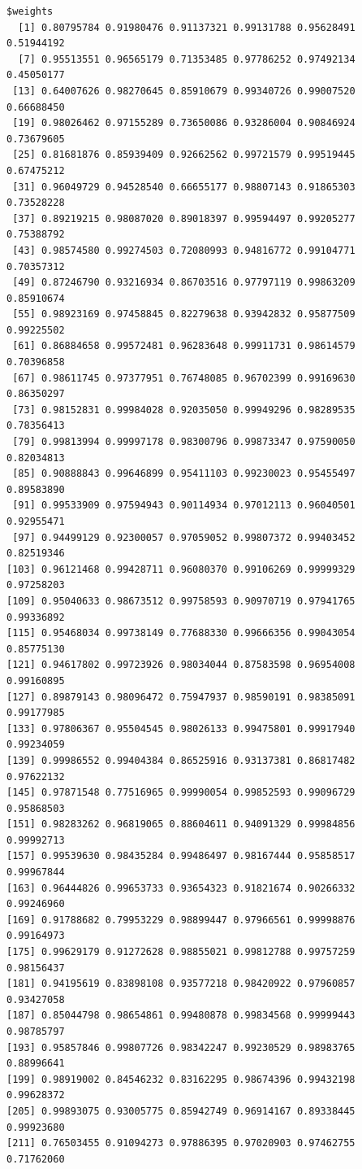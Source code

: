\documentclass[
  11pt,
  a4paper,
]{report}
\begin{document}
\begin{verbatim}
$weights
  [1] 0.80795784 0.91980476 0.91137321 0.99131788 0.95628491 0.51944192
  [7] 0.95513551 0.96565179 0.71353485 0.97786252 0.97492134 0.45050177
 [13] 0.64007626 0.98270645 0.85910679 0.99340726 0.99007520 0.66688450
 [19] 0.98026462 0.97155289 0.73650086 0.93286004 0.90846924 0.73679605
 [25] 0.81681876 0.85939409 0.92662562 0.99721579 0.99519445 0.67475212
 [31] 0.96049729 0.94528540 0.66655177 0.98807143 0.91865303 0.73528228
 [37] 0.89219215 0.98087020 0.89018397 0.99594497 0.99205277 0.75388792
 [43] 0.98574580 0.99274503 0.72080993 0.94816772 0.99104771 0.70357312
 [49] 0.87246790 0.93216934 0.86703516 0.97797119 0.99863209 0.85910674
 [55] 0.98923169 0.97458845 0.82279638 0.93942832 0.95877509 0.99225502
 [61] 0.86884658 0.99572481 0.96283648 0.99911731 0.98614579 0.70396858
 [67] 0.98611745 0.97377951 0.76748085 0.96702399 0.99169630 0.86350297
 [73] 0.98152831 0.99984028 0.92035050 0.99949296 0.98289535 0.78356413
 [79] 0.99813994 0.99997178 0.98300796 0.99873347 0.97590050 0.82034813
 [85] 0.90888843 0.99646899 0.95411103 0.99230023 0.95455497 0.89583890
 [91] 0.99533909 0.97594943 0.90114934 0.97012113 0.96040501 0.92955471
 [97] 0.94499129 0.92300057 0.97059052 0.99807372 0.99403452 0.82519346
[103] 0.96121468 0.99428711 0.96080370 0.99106269 0.99999329 0.97258203
[109] 0.95040633 0.98673512 0.99758593 0.90970719 0.97941765 0.99336892
[115] 0.95468034 0.99738149 0.77688330 0.99666356 0.99043054 0.85775130
[121] 0.94617802 0.99723926 0.98034044 0.87583598 0.96954008 0.99160895
[127] 0.89879143 0.98096472 0.75947937 0.98590191 0.98385091 0.99177985
[133] 0.97806367 0.95504545 0.98026133 0.99475801 0.99917940 0.99234059
[139] 0.99986552 0.99404384 0.86525916 0.93137381 0.86817482 0.97622132
[145] 0.97871548 0.77516965 0.99990054 0.99852593 0.99096729 0.95868503
[151] 0.98283262 0.96819065 0.88604611 0.94091329 0.99984856 0.99992713
[157] 0.99539630 0.98435284 0.99486497 0.98167444 0.95858517 0.99967844
[163] 0.96444826 0.99653733 0.93654323 0.91821674 0.90266332 0.99246960
[169] 0.91788682 0.79953229 0.98899447 0.97966561 0.99998876 0.99164973
[175] 0.99629179 0.91272628 0.98855021 0.99812788 0.99757259 0.98156437
[181] 0.94195619 0.83898108 0.93577218 0.98420922 0.97960857 0.93427058
[187] 0.85044798 0.98654861 0.99480878 0.99834568 0.99999443 0.98785797
[193] 0.95857846 0.99807726 0.98342247 0.99230529 0.98983765 0.88996641
[199] 0.98919002 0.84546232 0.83162295 0.98674396 0.99432198 0.99628372
[205] 0.99893075 0.93005775 0.85942749 0.96914167 0.89338445 0.99923680
[211] 0.76503455 0.91094273 0.97886395 0.97020903 0.97462755 0.71762060

\end{verbatim}
\end{document}
